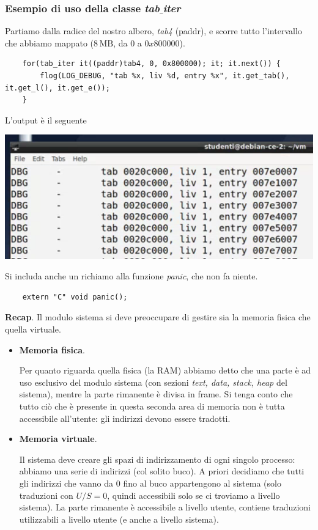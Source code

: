 \subsubsection{Esempio di uso della classe \emph{tab$\_$iter}} 
Partiamo dalla radice del nostro albero, \emph{tab4} (paddr), e scorre tutto l'intervallo che abbiamo mappato ($8\,\text{MB}$, da $0$ a $0x800000$).
\begin{verbatim}
	for(tab_iter it((paddr)tab4, 0, 0x800000); it; it.next()) {
		flog(LOG_DEBUG, "tab %x, liv %d, entry %x", it.get_tab(), it.get_l(), it.get_e());
	}
\end{verbatim}
L'output è il seguente
\begin{center}
	\includegraphics[scale=.85]{img/244.PNG}
\end{center} 
Si includa anche un richiamo alla funzione \emph{panic}, che non fa niente.
\begin{verbatim}
	extern "C" void panic();
\end{verbatim}

\normalsize 

\begin{framed}
	\noindent \textbf{Recap}. Il modulo sistema si deve preoccupare di gestire sia la memoria fisica che quella virtuale.
	\begin{itemize}
		\item \textbf{Memoria fisica}.
		
		Per quanto riguarda quella fisica (la RAM) abbiamo detto che una parte è ad uso esclusivo del modulo sistema (con sezioni \textit{text, data, stack, heap} del sistema), mentre la parte rimanente è divisa in frame. Si tenga conto che tutto ciò che è presente in questa seconda area di memoria non è tutta accessibile all'utente: gli indirizzi devono essere tradotti.
		\item \textbf{Memoria virtuale}.
		
		Il sistema deve creare gli spazi di indirizzamento di ogni singolo processo: abbiamo una serie di indirizzi (col solito buco). A priori decidiamo che tutti gli indirizzi che vanno da $0$ fino al buco appartengono al sistema (solo traduzioni con $U/S=0$, quindi accessibili solo se ci troviamo a livello sistema). La parte rimanente è accessibile a livello utente, contiene traduzioni utilizzabili a livello utente (e anche a livello sistema).
	\end{itemize}
\end{framed}

